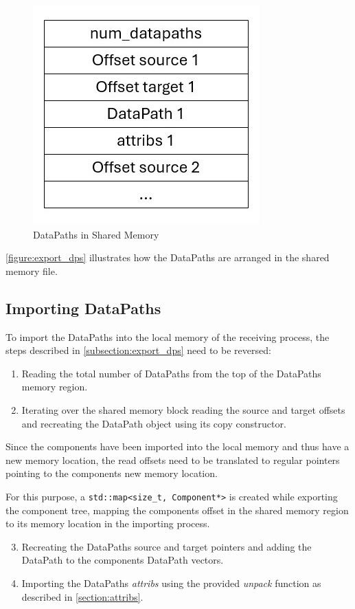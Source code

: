 \begin{figure}[!ht]
    \includegraphics[scale=0.7]{images/export_dps.jpg}
    \centering
    \caption{DataPaths in Shared Memory}
    \label{figure:export_dps}
\end{figure}

\autoref{figure:export_dps} illustrates how the DataPaths are arranged in the shared memory file.

\subsection{Importing DataPaths}
To import the DataPaths into the local memory of the receiving process, the steps described in \autoref{subsection:export_dps} need to be reversed:

\begin{enumerate}
    \item Reading the total number of DataPaths from the top of the DataPaths memory region.
    \item Iterating over the shared memory block reading the source and target offsets and recreating the DataPath object using its copy constructor.
\end{enumerate}

Since the components have been imported into the local memory and thus have a new memory location, the read offsets need to be translated to regular pointers
pointing to the components new memory location.

For this purpose, a \lstinline|std::map<size_t, Component*>| is created while exporting the component tree, mapping the components offset in the shared memory region to its
memory location in the importing process.

\begin{enumerate}
    \setcounter{enumi}{2}
    \item Recreating the DataPaths source and target pointers and adding the DataPath to the components DataPath vectors.
    \item Importing the DataPaths \emph{attribs} using the provided \emph{unpack} function as described in \autoref{section:attribs}.
\end{enumerate}